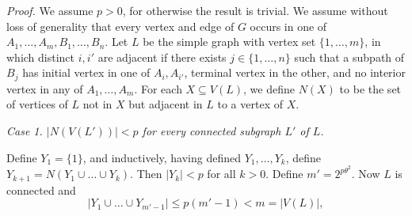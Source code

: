 \textit{Proof.} We assume $p > 0$, for otherwise the result is trivial. We assume without loss of generality that every vertex and edge of $G$ occurs in one of $A_1, \dots, A_m, B_1, \dots, B_n$. Let $L$ be the simple graph with vertex set $\{1, \dots, m\}$, in which distinct $i, i'$ are adjacent if there exists $j \in \{1, \dots, n\}$ such that a subpath of $B_j$ has initial vertex in one of $A_i, A_{i'}$, terminal vertex in the other, and no interior vertex in any of $A_1, \dots, A_m$. For each $X \subseteq V(L)$, we define $N(X)$ to be the set of vertices of $L$ not in $X$ but adjacent in $L$ to a vertex of $X$.

\textit{Case 1. $|N(V(L'))| < p$ for every connected subgraph $L'$ of $L$.}

Define $Y_1 = \{1\}$, and inductively, having defined $Y_1, \dots, Y_k$, define $Y_{k+1} = N(Y_1 \cup \dots \cup Y_k)$. Then $|Y_k| < p$ for all $k > 0$. Define $m' = 2^{p\theta^2}$. Now $L$ is connected and
\begin{equation*}
|Y_1 \cup \dots \cup Y_{m' - 1}| \le p(m' - 1) < m = |V(L)|,
\end{equation*}
